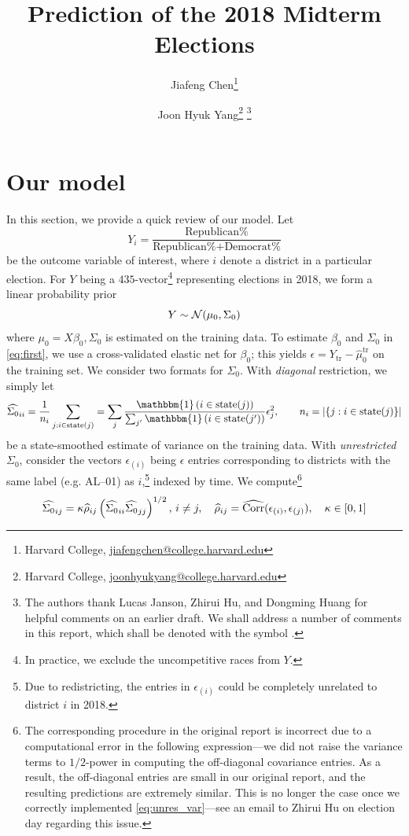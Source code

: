 \documentclass[12pt, letterpaper]{article}
\title{\sffamily\bfseries{Prediction of the 2018 Midterm Elections}}
\author{Jiafeng Chen\thanks{Harvard College, \url{jiafengchen@college.harvard.edu}} \and Joon Hyuk Yang\thanks{Harvard College, \url{joonhyukyang@college.harvard.edu}}\,\,\thanks{The authors thank Lucas Janson, Zhirui Hu, and Dongming Huang for helpful comments on an earlier draft. We shall address a number of comments in this report, which shall be denoted with the symbol \cm.}}
\newcommand{\one}{\mathbbm{1}}
\begin{document}
\maketitle
\section{Our model}

In this section, we provide a quick review of our model. Let \begin{equation}
  Y_i = \frac{\text{Republican\%}}{\text{Republican\%}+\text{Democrat\%}}
  \label{eq:def_y}
\end{equation}
be the outcome variable of interest, where $i$ denote a district in a particular election. For $Y$ being a $435$-vector\footnote{In practice, we exclude the uncompetitive races from $Y$.} representing elections in 2018, we form a linear probability prior \begin{equation}
  Y \sim \mathcal{N}(\mu_0, \Sigma_0)\label{eq:first}
\end{equation}
where $\mu_0 = X\beta_0, \Sigma_0$ is estimated
on the training data. To estimate $\beta_0$ and $\Sigma_0$ in \eqref{eq:first}, we use a cross-validated elastic net for $\beta_0$; this yields $\epsilon = Y_{\text{tr}} - \hat \mu_0^{\text{tr}}$ on the training set. We consider two formats for $\Sigma_0$. With \emph{diagonal} restriction, we simply let 
\begin{equation}
  \hat {\Sigma_0}_{ii} = \frac{1}{n_i} \sum_{j : i\in\text{state}(j)} = \sum_j \frac{\one\pr{i\in\text{state}(j)}}{\sum_{j'} \one\pr{i\in\text{state}(j')}} \epsilon_j^2, \qquad n_i = |\{j : i\in\text{state}(j)\}|
\label{eq:diag_var}
\end{equation}
be a state-smoothed estimate of variance on the training data. With \emph{unrestricted} $\Sigma_0$, consider the vectors $\epsilon_{(i)}$ being $\epsilon$ entries corresponding to districts with the same label (e.g. AL--01) as $i$,\footnote{Due to redistricting, the entries in $\epsilon_{(i)}$ could be completely unrelated to district $i$ in 2018.} indexed by time. We compute\footnote{The corresponding procedure in the original report is incorrect due to a computational error in the following expression---we did not raise the variance terms to $1/2$-power in computing the off-diagonal covariance entries. As a result, the off-diagonal entries are small in our original report, and the resulting predictions are extremely similar. This is no longer the case once we correctly implemented \eqref{eq:unres_var}---see an email to Zhirui Hu on election day regarding this issue.} \begin{equation}
  \widehat{\Sigma_0}_{ij} = \kappa \widehat \rho_{ij} \left({\widehat {\Sigma_0}_{ii} \widehat {\Sigma_0}_{jj}}\right)^{1/2},\, i\neq j,\quad \widehat \rho_{ij} = \widehat{\operatorname{Corr}}(\epsilon_{(i)}, \epsilon_{(j)}), \quad \kappa\in [0,1]
\label{eq:unres_var}
\end{equation}
\end{document}
